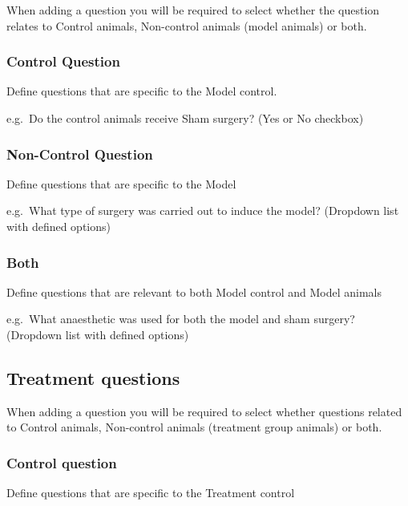 \documentclass[
]{book}
\begin{document}
When adding a question you will be required to select whether the question relates to Control animals, Non-control animals (model animals) or both.

\hypertarget{control-question}{%
\subsubsection{Control Question}\label{control-question}}

Define questions that are specific to the Model control.

e.g.~Do the control animals receive Sham surgery?
(Yes or No checkbox)

\hypertarget{non-control-question}{%
\subsubsection{Non-Control Question}\label{non-control-question}}

Define questions that are specific to the Model

e.g.~What type of surgery was carried out to induce the model?
(Dropdown list with defined options)

\hypertarget{both}{%
\subsubsection{Both}\label{both}}

Define questions that are relevant to both Model control and Model animals

e.g.~What anaesthetic was used for both the model and sham surgery?
(Dropdown list with defined options)

\hypertarget{treatment-questions}{%
\subsection{Treatment questions}\label{treatment-questions}}

When adding a question you will be required to select whether questions related to Control animals, Non-control animals (treatment group animals) or both.

\hypertarget{control-question-1}{%
\subsubsection{Control question}\label{control-question-1}}

Define questions that are specific to the Treatment control
\end{document}
